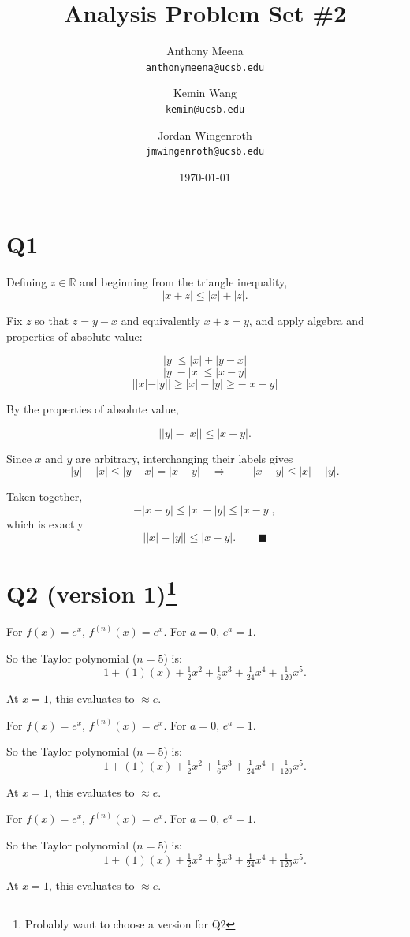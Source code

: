 \documentclass{article}
\author{Anthony Meena \\ \texttt{anthonymeena@ucsb.edu}\and Kemin Wang\\\texttt{kemin@ucsb.edu}\and Jordan Wingenroth\\\texttt{jmwingenroth@ucsb.edu}}
\title{Analysis Problem Set \#2}
\date{\today}
\begin{document}
\maketitle

\section*{Q1}

Defining $z \in \mathbb{R}$ and beginning from the triangle inequality,
\[
|x+z|\le |x|+|z| .
\]

Fix $z$ so that $z=y-x$ and equivalently $x+z=y$, and apply algebra and properties of absolute value:

$$|y|\le |x|+|y-x|$$
$$|y|-|x|\le |x-y|$$
$$||x|-|y|| \ge |x|-|y|\ge -|x-y|$$


By the properties of absolute value,

$$\left||y|-|x|\right|\le |x-y| .$$


Since $x$ and $y$ are arbitrary, interchanging their labels gives
\[
|y|-|x|\le |y-x|=|x-y|
\quad\Longrightarrow\quad
-|x-y|\le |x|-|y| .
\]

Taken together,
\[
-|x-y|\le |x|-|y|\le |x-y|,
\]
which is exactly
\[
\big||x|-|y|\big|\le |x-y| . \qquad\blacksquare
\]

\section*{Q2 (version 1)\footnote{Probably want to choose a version for Q2}}

For $f(x)=e^x$, $f^{(n)}(x)=e^x$. For $a=0$, $e^a=1$.

So the Taylor polynomial ($n=5$) is:
\[
1+(1)(x)+\tfrac{1}{2}x^2+\tfrac{1}{6}x^3+\tfrac{1}{24}x^4+\tfrac{1}{120}x^5 .
\]

At $x=1$, this evaluates to $\approx e$.

For $f(x)=e^x$, $f^{(n)}(x)=e^x$. For $a=0$, $e^a=1$.

So the Taylor polynomial ($n=5$) is:
\[
1+(1)(x)+\tfrac{1}{2}x^2+\tfrac{1}{6}x^3+\tfrac{1}{24}x^4+\tfrac{1}{120}x^5 .
\]

At $x=1$, this evaluates to $\approx e$.

For $f(x)=e^x$, $f^{(n)}(x)=e^x$. For $a=0$, $e^a=1$.

So the Taylor polynomial ($n=5$) is:
\[
1+(1)(x)+\tfrac{1}{2}x^2+\tfrac{1}{6}x^3+\tfrac{1}{24}x^4+\tfrac{1}{120}x^5 .
\]

At $x=1$, this evaluates to $\approx e$.
\end{document}
